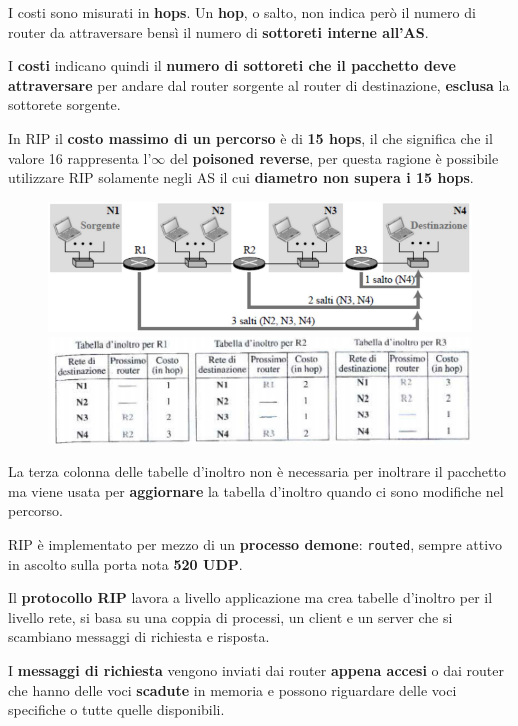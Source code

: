 \documentclass[11pt,a4paper,oneside]{book}
\theoremstyle{definition}
\begin{document}
I costi sono misurati in \textbf{hops}. Un \textbf{hop}, o salto, non indica però il numero di router da attraversare bensì il numero di \textbf{sottoreti interne all'AS}.

I \textbf{costi} indicano quindi il \textbf{numero di sottoreti che il pacchetto deve attraversare} per andare dal router sorgente al router di destinazione, \textbf{esclusa} la sottorete sorgente.

In RIP il \textbf{costo massimo di un percorso} è di \textbf{15 hops}, il che significa che il valore 16 rappresenta l'$\infty$ del \textbf{poisoned reverse}, per questa ragione è possibile utilizzare RIP solamente negli AS il cui \textbf{diametro non supera i 15 hops}.

\begin{figure}[!h]
	\includegraphics[scale=0.4]{Immagini/RIP.png}
	\includegraphics[scale=0.4]{Immagini/RIPtab.png}
	\centering
\end{figure}

La terza colonna delle tabelle d'inoltro non è necessaria per inoltrare il pacchetto ma viene usata per \textbf{aggiornare} la tabella d'inoltro quando ci sono modifiche nel percorso.

RIP è implementato per mezzo di un \textbf{processo demone}: \texttt{routed}, sempre attivo in ascolto sulla porta nota \textbf{520 UDP}.

Il \textbf{protocollo RIP} lavora a livello applicazione ma crea tabelle d'inoltro per il livello rete, si basa su una coppia di processi, un client e un server che si scambiano messaggi di richiesta e risposta.

I \textbf{messaggi di richiesta} vengono inviati dai router \textbf{appena accesi} o dai router che hanno delle voci \textbf{scadute} in memoria e possono riguardare delle voci specifiche o tutte quelle disponibili.
\end{document}
